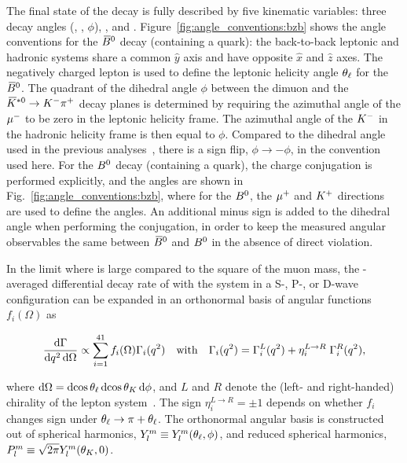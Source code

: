 The final state of the decay \BdToKpimm is fully described by five kinematic variables: three decay angles (\thetal, \thetak, $\phi$), \mkpi, and \qsq.
Figure~\ref{fig:angle_conventions:bzb} shows the angle conventions for the ${{\kern 0.18em\overline{\kern -0.18em B}{}}{}^0}$ decay (containing a \bquark quark): the back-to-back leptonic and hadronic systems share a common $\hat{y}$ axis and have opposite $\hat{x}$ and $\hat{z}$ axes.
The negatively charged lepton is used to define the leptonic helicity angle $\theta_\ell$ for the ${{\kern 0.18em\overline{\kern -0.18em B}{}}{}^0}$.
The quadrant of the dihedral angle $\phi$ between the dimuon and the ${{\kern 0.2em\overline{\kern -0.2em K}{}}{}^{*0}} \rightarrow {\ensuremath{{K}^-}}{\ensuremath{{\pi}^+}}$ decay planes is determined by requiring the azimuthal angle of the ${\mu^-}$ to be zero in the leptonic helicity frame. The azimuthal angle of the ${{K}^-}$ in the hadronic helicity frame is then equal to $\phi$. Compared to the dihedral angle used in the previous \lhcb analyses~\cite{LHCB-PAPER-2011-020,LHCB-PAPER-2013-019,LHCB-PAPER-2013-037,LHCB-PAPER-2015-051}, there is a sign flip, $\phi \to -\phi$, in the convention used here. For the ${{B}^0}$ decay (containing a \bquarkbar quark), the charge conjugation is performed explicitly, and the angles are shown in Fig.~\ref{fig:angle_conventions:bzb}, where for the ${{B}^0}$, the ${\mu^+}$ and ${{K}^+}$ directions are used to define the angles. An additional minus sign is added to the dihedral angle when performing the \CP conjugation, in order to keep the measured angular observables the same between ${{\kern 0.18em\overline{\kern -0.18em B}{}}{}^0}$ and ${{B}^0}$ in the absence of direct \CP violation.

In the limit where \qsq is large compared to the square of the muon mass, the \CP-averaged differential decay rate of \BdToKpimm with the \Kp\pim system in a S-, P-, or D-wave configuration can be expanded in an orthonormal basis of angular functions $f_i(\Omega)$ as

\begin{equation}
\label{eqn:vector_moments}
\frac{\mathrm{d}\Gamma }{\mathrm{d}{q^2}\,\mathrm{d}\Omega} \propto \sum^{41}_{i=1} f_i (\Omega) \Gamma_i({q^2})
 \quad\mbox{with}\quad
\Gamma_i({q^2}) = \Gamma^L_i({q^2}) + \eta^{L\rightarrow R}_i\; \Gamma^R_i({q^2}),
\end{equation}

\noindent where $\mathrm{d}\Omega = \mathrm{d}\!\cos{\theta_\ell}\,\mathrm{d}\!\cos{\theta_K}\,\mathrm{d}\phi$, and $L$ and $R$ denote the (left- and right-handed) chirality of the lepton system~\cite{biplab}. The sign $\eta^{L\to R}_i=\pm 1$ depends on whether $f_i$ changes sign under $\theta_\ell \rightarrow \pi + \theta_\ell$. 
\noindent The orthonormal angular basis is constructed out of spherical harmonics, \mbox{$Y^m_l \equiv Y^m_l (\theta_\ell,\phi)$}, and reduced spherical harmonics, \mbox{${P^m_l \equiv \sqrt{2 \pi}Y^m_l(\theta_K,0)}$}.
 
